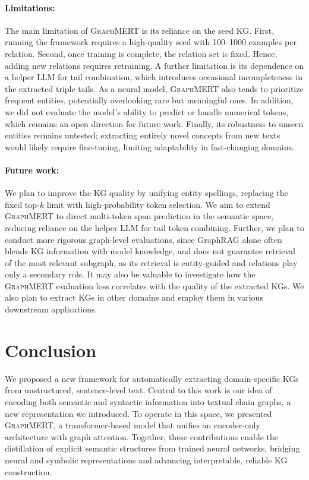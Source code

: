 \documentclass[10pt]{article}
\newcommand{\ours}{\textsc{GraphMERT}\xspace}
\begin{document}
\paragraph{Limitations:}
The main limitation of \ours is its reliance on the seed KG. First, running the framework requires a high-quality seed with 100–1000 examples per relation. Second, once training is complete, the relation set is fixed. Hence, adding new relations requires retraining. A further limitation is its dependence on a helper LLM for tail combination, which introduces occasional incompleteness in the extracted triple tails. As a neural model, \ours also tends to prioritize frequent entities, potentially overlooking rare but meaningful ones. In addition, we did not evaluate the model’s ability to predict or handle numerical tokens, which remains an open direction for future work. Finally, its robustness to unseen entities remains untested; extracting entirely novel concepts from new texts would likely require fine-tuning, limiting adaptability in fast-changing domains.

\paragraph{Future work:}
We plan to improve the KG quality by unifying entity spellings, replacing the fixed top-$k$ limit with high-probability token selection. We aim to extend \ours to direct multi-token span prediction in the semantic space, reducing reliance on the helper LLM for tail token combining. Further, we plan to conduct more rigorous graph-level evaluations, since GraphRAG alone often blends KG information with model knowledge, and does not guarantee retrieval of the most relevant subgraph, as its retrieval is entity-guided and relations play only a secondary role. It may also be valuable to investigate how the \ours evaluation loss correlates with the quality of the extracted KGs. We also plan to extract KGs in other domains and employ them in various downstream applications.

\section{Conclusion}
\label{sec:conclusion}

We proposed a new framework for automatically extracting domain-specific KGs from unstructured, sentence-level text. Central to this work is our idea of encoding both semantic and syntactic information into textual chain graphs, a new representation we introduced. To operate in this space, we presented \ours, a transformer-based model that unifies an encoder-only architecture with graph attention. Together, these contributions enable the distillation of explicit semantic structures from trained neural networks, bridging neural and symbolic representations and advancing interpretable, reliable KG construction.
\end{document}
